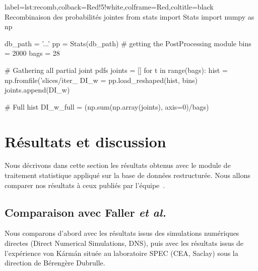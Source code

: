 \documentclass[13pt, a4paper]{extarticle}
\begin{document}
\vspace{.2cm}

\noindent\begin{pythoncode}{label=lst:recomb,colback=Red!5!white,colframe=Red,coltitle=black}
  {Recombinaison des probabilités jointes}
  from stats import Stats
  import numpy as np
  
  db_path = '...'
  pp = Stats(db_path)                    # getting the PostProcessing module
  bins = 2000
  bags = 28

  # Gathering all partial joint pdfs
  joints = []
  for t in range(bags):
    hist = np.fromfile('slices/iter_%
    DI_w = pp.load_reshaped(hist, bins)
    joints.append(DI_w)

  # Full hist
  DI_w_full = (np.sum(np.array(joints), axis=0)/bags)
\end{pythoncode}

\section{Résultats et discussion}\label{sec:results}
Nous décrivons dans cette section les résultats obtenus avec le module de traitement 
statistique appliqué sur la base de données restructurée. Nous allons comparer nos 
résultats à ceux publiés par l'équipe~\cite{Faller-Intermittency}.

\subsection{Comparaison avec Faller \emph{et al.}~\cite{Faller-Intermittency}}
Nous comparons d'abord avec les résultats issus des simulations numériques directes 
(Direct Numerical Simulations, DNS), puis avec les résultats issus de l'expérience
 von Kármán située au laboratoire SPEC (CEA, Saclay) sous la direction de Bérengère Dubrulle.
\end{document}
